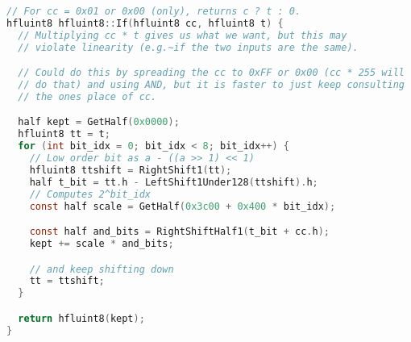 
\begin{lstlisting}[language=C]
  // For cc = 0x01 or 0x00 (only), returns c ? t : 0.
hfluint8 hfluint8::If(hfluint8 cc, hfluint8 t) {
  // Multiplying cc * t gives us what we want, but this may
  // violate linearity (e.g.~if the two inputs are the same).

  // Could do this by spreading the cc to 0xFF or 0x00 (cc * 255 will
  // do that) and using AND, but it is faster to just keep consulting
  // the ones place of cc.

  half kept = GetHalf(0x0000);
  hfluint8 tt = t;
  for (int bit_idx = 0; bit_idx < 8; bit_idx++) {
    // Low order bit as a - ((a >> 1) << 1)
    hfluint8 ttshift = RightShift1(tt);
    half t_bit = tt.h - LeftShift1Under128(ttshift).h;
    // Computes 2^bit_idx
    const half scale = GetHalf(0x3c00 + 0x400 * bit_idx);

    const half and_bits = RightShiftHalf1(t_bit + cc.h);
    kept += scale * and_bits;

    // and keep shifting down
    tt = ttshift;
  }

  return hfluint8(kept);
}
\end{lstlisting}

